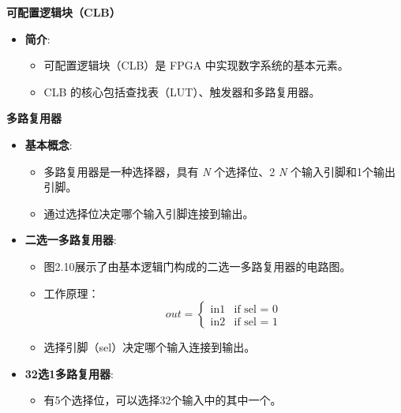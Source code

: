 \begin{frame}[allowframebreaks]{\textbf{可配置逻辑块（CLB）}}
\begin{itemize}
\tightlist
\item
    \textbf{简介}:

    \begin{itemize}
    \tightlist
    \item
    可配置逻辑块（CLB）是 FPGA 中实现数字系统的基本元素。
    \item
    CLB 的核心包括查找表（LUT）、触发器和多路复用器。
    \end{itemize}
\end{itemize}

\begin{block}{\textbf{多路复用器}}
\label{ux591aux8defux590dux7528ux5668}
\begin{itemize}
\tightlist
\item
    \textbf{基本概念}:

    \begin{itemize}
    \tightlist
    \item
    多路复用器是一种选择器，具有 \emph{N} 个选择位、2 \emph{N}
    个输入引脚和1个输出引脚。
    \item
    通过选择位决定哪个输入引脚连接到输出。
    \end{itemize}
\item
    \textbf{二选一多路复用器}:

    \begin{itemize}
    \tightlist
    \item
    图2.10展示了由基本逻辑门构成的二选一多路复用器的电路图。
    \item
    工作原理：
    \[out = \begin{cases} \text{in1} & \text{if sel = 0} \\ \text{in2} & \text{if sel = 1} \end{cases} \tag{2.4}\]
    \item
    选择引脚（sel）决定哪个输入连接到输出。
    \end{itemize}
\item
    \textbf{32选1多路复用器}:

    \begin{itemize}
    \tightlist
    \item
    有5个选择位，可以选择32个输入中的其中一个。
    \end{itemize}
\end{itemize}


\end{block}
\end{frame}
